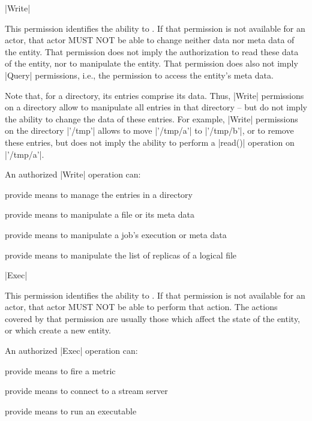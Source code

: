 \begin{list}{}{}
 
  \item{\sunshift|Write|}
 
  This permission identifies the ability to .  If that permission is not
  available for an actor, that actor MUST NOT be able to change
  neither data nor meta data of the entity.  That permission
  does not imply the authorization to read these data of the
  entity, nor to manipulate the entity.  That permission does
  also not imply |Query| permissions, i.e., the permission to
  access the entity's meta data.
 
  Note that, for a directory, its entries comprise its data.
  Thus, |Write| permissions on a directory allow to manipulate
  all entries in that directory -- but do not imply the ability
  to change the data of these entries.  For example, |Write|
  permissions on the directory |'/tmp'| allows to move
  |'/tmp/a'| to |'/tmp/b'|, or to remove these entries, but does
  not imply the ability to perform a |read()| operation on
  |'/tmp/a'|.
 
  An authorized |Write| operation can:
 
  \begin{shortlist}
   \item provide means to manage the entries in a directory
   \item provide means to manipulate a file or its meta data
   \item provide means to manipulate a job's execution or meta data
   \item provide means to manipulate the list of replicas of a logical file
  \end{shortlist}
 
 
  \item{\sunshift|Exec|}
 
  This permission identifies the ability to .  If that permission is not available for an
  actor, that actor MUST NOT be able to perform that action.
  The actions covered by that permission are usually those which
  affect the state of the entity, or which create a new entity.
 
  An authorized |Exec| operation can:
 
  \begin{shortlist}
   \item provide means to fire a metric
   \item provide means to connect to a stream server
   \item provide means to run an executable
  \end{shortlist}
 

\end{list}

